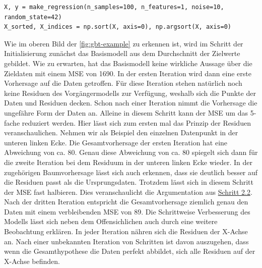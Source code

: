 \begin{verbatim}
X, y = make_regression(n_samples=100, n_features=1, noise=10, random_state=42)
X_sorted, X_indices = np.sort(X, axis=0), np.argsort(X, axis=0)
\end{verbatim}
Wie im oberen Bild der \autoref{fig:gbt-example} zu erkennen ist, wird im Schritt der Initialisierung zunächst das Basismodell aus dem Durchschnitt der Zielwerte gebildet. Wie zu erwarten, hat das Basismodell keine wirkliche Aussage über die Zieldaten mit einem MSE von 1690.
\newline
\newline
In der ersten Iteration wird dann eine erste Vorhersage auf die Daten getroffen. Für diese Iteration stehen natürlich noch keine Residuen des Vorgängermodells zur Verfügung, weshalb sich die Punkte der Daten und Residuen decken. Schon nach einer Iteration nimmt die Vorhersage die ungefähre Form der Daten an. Alleine in diesem Schritt kann der MSE um das 5-fache reduziert werden.
\newline
Hier lässt sich zum ersten mal das Prinzip der Residuen veranschaulichen. Nehmen wir als Beispiel den einzelnen Datenpunkt in der unteren linken Ecke. Die Gesamtvorhersage der ersten Iteration hat eine Abweichung von ca. 80. Genau diese Abweichung von ca. 80 spiegelt sich dann für die zweite Iteration bei dem Residuum in der unteren linken Ecke wieder. In der zugehörigen Baumvorhersage lässt sich auch erkennen, dass sie deutlich besser auf die Residuen passt als die Ursprungsdaten. Trotzdem lässt sich in diesem Schritt der MSE fast halbieren. Dies veranschaulicht die Argumentation aus \hyperref[para:GBT_training_tree]{Schritt 2.2}.
\newline
\newline
Nach der dritten Iteration entspricht die Gesamtvorhersage ziemlich genau den Daten mit einem verbleibenden MSE von 89. Die Schrittweise Verbesserung des Modells lässt sich neben dem Offensichlichen auch durch eine weitere Beobachtung erklären. In jeder Iteration nähren sich die Residuen der X-Achse an. Nach einer unbekannten Iteration von Schritten ist davon auszugehen, dass wenn die Gesamthypothese die Daten perfekt abbildet, sich alle Residuen auf der X-Achse befinden.

